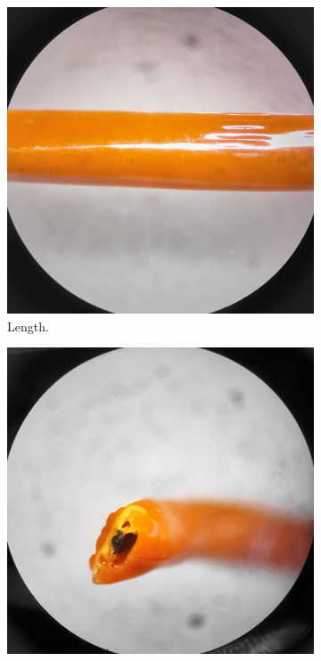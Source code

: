 \begin{figure}[h!]
        \centering
        \begin{subfigure}[b]{0.45\textwidth}
                \includegraphics[width=\textwidth]{./figures/filament-108-40-dip-side}
                \caption{Length.}
                \label{fig:filament-108-40-dip-side}
        \end{subfigure}
        \begin{subfigure}[b]{0.45\textwidth}
                \includegraphics[width=\textwidth]{./figures/filament-108-40-dip-end}

\end{subfigure}
\end{figure}
